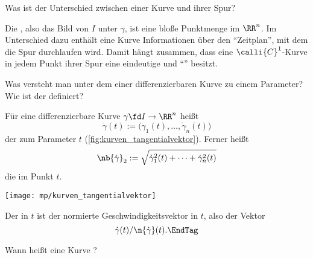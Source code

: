   \begin{frage}
    Was ist der Unterschied zwischen einer Kurve und ihrer Spur?
  \end{frage}

  \begin{antwort}
    Die , also das Bild von $I$ unter $\gamma$, ist 
    eine bloße Punktmenge im $\RR^n$. Im Unterschied dazu enthält eine 
    Kurve Informationen über den "`Zeitplan"', mit dem die Spur durchlaufen 
    wird. Damit hängt zusammen, dass eine $\calli{C}^1$-Kurve in jedem Punkt ihrer 
    Spur eine eindeutige  und "`"' 
    besitzt.  
  \end{antwort}

  \begin{frage}
    Was versteht man unter dem  einer differenzierbaren 
    Kurve zu einem Parameter? Wie ist 
    der  definiert?
  \end{frage}


  \begin{antwort}
    Für eine differenzierbare Kurve $\gamma\fd I\to \RR^n$ heißt
    \[
    \dot{\gamma}(t) := \big( \dot{\gamma}_1 (t), \ldots, \dot{\gamma}_n (t) \big)
    \]
    der  zum Parameter $t$ (\sieheAbbildung\ref{fig:kurven_tangentialvektor}). Ferner heißt 
    \[
    \nb{\dot{\gamma}}_2 := \sqrt{ \dot{\gamma}_1^2(t)+ \cdots 
      + \dot{\gamma}_n^2 (t) } 
    \]
    die  im Punkt $t$. 

    \begin{center}
      \texttt{[image: mp/kurven\_tangentialvektor]}
      \label{fig:kurven_tangentialvektor}
    \end{center}

    Der  in $t$ ist der normierte 
    Geschwindigkeitsvektor in $t$, also der Vektor 
    \[
    \dot{\gamma}(t)/\n{\dot\gamma}(t). \EndTag
    \]
  \end{antwort} 



  \begin{frage}
    Wann heißt eine Kurve ? 
  \end{frage}

